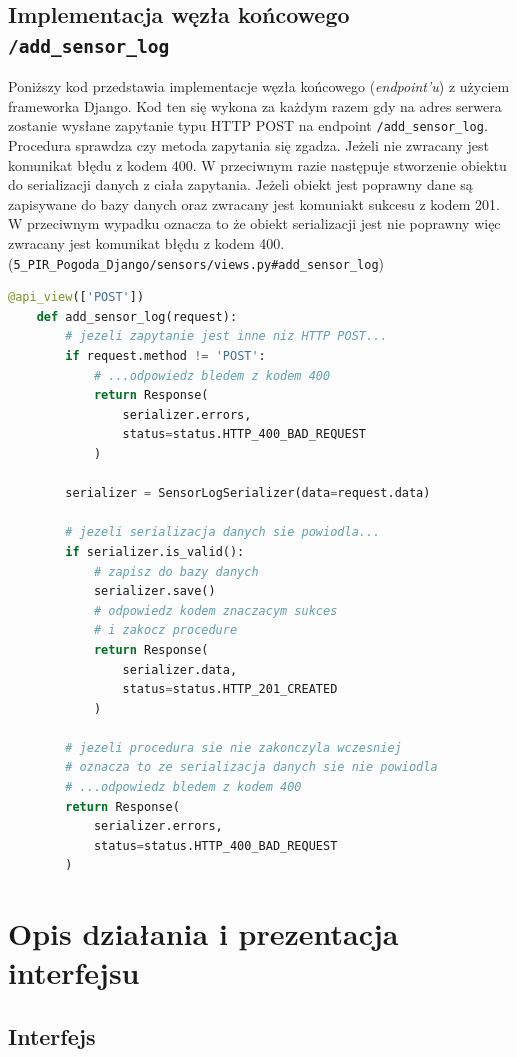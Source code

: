 \documentclass[12pt,a4paper]{article}
\begin{document}
    \subsection{Implementacja węzła końcowego \texttt{/add\_sensor\_log}}
    Poniższy kod przedstawia implementacje węzła końcowego (\emph{endpoint'u}) z użyciem frameworka Django. Kod ten się wykona za każdym razem gdy na adres serwera zostanie wysłane zapytanie typu HTTP POST na endpoint \texttt{/add\_sensor\_log}. Procedura sprawdza czy metoda zapytania się zgadza. Jeżeli nie zwracany jest komunikat błędu z kodem 400. W przeciwnym razie następuje stworzenie obiektu do serializacji danych z ciała zapytania. Jeżeli obiekt jest poprawny dane są zapisywane do bazy danych oraz zwracany jest komuniakt sukcesu z kodem 201. W przeciwnym wypadku oznacza to że obiekt serializacji jest nie poprawny więc zwracany jest komunikat błędu z kodem 400.\\
    (\texttt{5\_PIR\_Pogoda\_Django/sensors/views.py\#add\_sensor\_log})
    \begin{lstlisting}[language=Python]
    @api_view(['POST'])
    def add_sensor_log(request):
        # jezeli zapytanie jest inne niz HTTP POST...
        if request.method != 'POST':
            # ...odpowiedz bledem z kodem 400
            return Response(
                serializer.errors,
                status=status.HTTP_400_BAD_REQUEST
            )

        serializer = SensorLogSerializer(data=request.data)

        # jezeli serializacja danych sie powiodla...
        if serializer.is_valid():
            # zapisz do bazy danych
            serializer.save()
            # odpowiedz kodem znaczacym sukces
            # i zakocz procedure
            return Response(
                serializer.data,
                status=status.HTTP_201_CREATED
            )

        # jezeli procedura sie nie zakonczyla wczesniej
        # oznacza to ze serializacja danych sie nie powiodla
        # ...odpowiedz bledem z kodem 400
        return Response(
            serializer.errors,
            status=status.HTTP_400_BAD_REQUEST
        )
    \end{lstlisting}

    \section{Opis działania i prezentacja interfejsu}
    \subsection{Interfejs}
\end{document}
